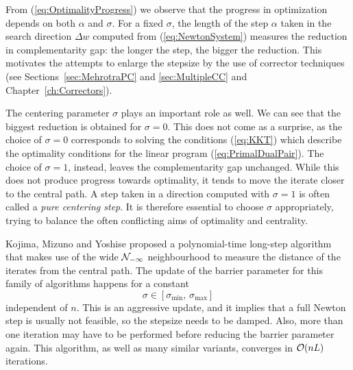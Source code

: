 From (\ref{eq:OptimalityProgress}) we observe that the progress in
optimization depends on both $\alpha$ and $\sigma$.
For a fixed $\sigma$, the length of the step $\alpha$ taken in 
the search direction
$\Delta w$ computed from (\ref{eq:NewtonSystem})
measures the reduction in complementarity gap: 
the longer the step, the bigger the reduction. This motivates
the attempts to enlarge the stepsize by the use of corrector
techniques (see Sections~\ref{sec:MehrotraPC} and
\ref{sec:MultipleCC} and Chapter~\ref{ch:Correctors}).

The centering parameter $\sigma$ plays an important role as well.
We can see that the biggest reduction is obtained for $\sigma = 0$.
This does not come as a surprise, as the choice of $\sigma = 0$
corresponds to solving the \KKT conditions (\ref{eq:KKT}) which
describe the optimality conditions for the linear program
(\ref{eq:PrimalDualPair}). The choice of $\sigma = 1$, instead,
leaves the complementarity gap unchanged. While this does not
produce progress towards optimality, it tends to move the iterate
closer to the central path. A step taken in a direction computed
with $\sigma = 1$ is often called a {\em pure centering step}.
It is therefore essential to choose $\sigma$ appropriately, trying
to balance the often conflicting aims of optimality and centrality.

Kojima, Mizuno and Yoshise \cite{KojimaMizunoYoshise89} 
proposed a polynomial-time long-step algorithm 
that makes use of the wide $\mathcal{N}_{-\infty}$ neighbourhood
to measure the distance of the iterates from the central path.
The update of the barrier parameter for this family of algorithms
happens for a constant 
\[
  \sigma \in [\sigma_{\min},\, \sigma_{\max}]
\]
independent of $n$. 
This is an aggressive update, and it implies that a full Newton
step is usually not feasible, so the stepsize needs to be damped.
Also, more than one iteration may have to be performed before
reducing the barrier parameter again.
This algorithm, as well as many similar variants,
converges in $\mathcal{O}(nL)$ iterations.

